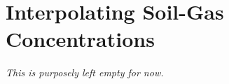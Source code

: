 \section{Interpolating Soil-Gas Concentrations}

\textit{This is purposely left empty for now.}


\begin{comment}
\begin{figure}[htb!]
  \texttt{[image: kriging/flowchart-figure0.pdf]}
  \caption{Flowchart showing how the Kriging interpolation of the EPA duplex sub-surface contaminant concentration data is performed.}
  \label{fig:kriging_flowchart}
\end{figure}
\end{comment}
